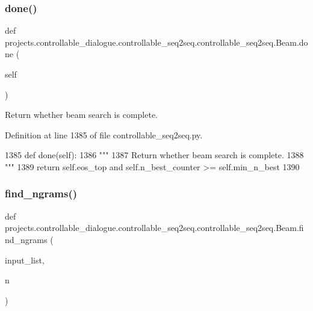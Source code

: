 \subsubsection{\texorpdfstring{done()}{done()}}
{\footnotesize\ttfamily def projects.\+controllable\+\_\+dialogue.\+controllable\+\_\+seq2seq.\+controllable\+\_\+seq2seq.\+Beam.\+done (\begin{DoxyParamCaption}\item[{}]{self }\end{DoxyParamCaption})}

\begin{DoxyVerb}Return whether beam search is complete.
\end{DoxyVerb}
 

Definition at line 1385 of file controllable\+\_\+seq2seq.\+py.


\begin{DoxyCode}
1385     \textcolor{keyword}{def }done(self):
1386         \textcolor{stringliteral}{"""}
1387 \textcolor{stringliteral}{        Return whether beam search is complete.}
1388 \textcolor{stringliteral}{        """}
1389         \textcolor{keywordflow}{return} self.eos\_top \textcolor{keywordflow}{and} self.n\_best\_counter >= self.min\_n\_best
1390 
\end{DoxyCode}
\mbox{\label{classprojects_1_1controllable__dialogue_1_1controllable__seq2seq_1_1controllable__seq2seq_1_1Beam_af5324f7145d2e11bbfcb44bbeda5dbec}} 
\subsubsection{\texorpdfstring{find\+\_\+ngrams()}{find\_ngrams()}}
{\footnotesize\ttfamily def projects.\+controllable\+\_\+dialogue.\+controllable\+\_\+seq2seq.\+controllable\+\_\+seq2seq.\+Beam.\+find\+\_\+ngrams (\begin{DoxyParamCaption}\item[{}]{input\+\_\+list,  }\item[{}]{n }\end{DoxyParamCaption})\hspace{0.3cm}{\ttfamily [static]}}

